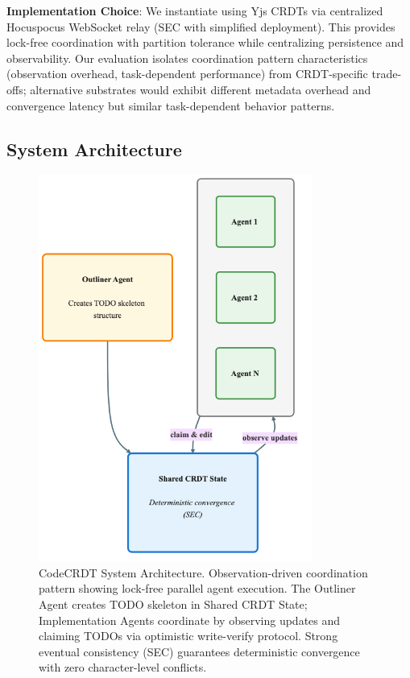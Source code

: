 \documentclass{article}
\begin{document}
\textbf{Implementation Choice}: We instantiate using Yjs CRDTs via centralized Hocuspocus WebSocket relay (SEC with simplified deployment). This provides lock-free coordination with partition tolerance while centralizing persistence and observability. Our evaluation isolates coordination pattern characteristics (observation overhead, task-dependent performance) from CRDT-specific trade-offs; alternative substrates would exhibit different metadata overhead and convergence latency but similar task-dependent behavior patterns.

\subsection{System Architecture}

\begin{figure}[!ht]
\centering
\includegraphics[width=0.8\textwidth,height=0.38\textheight,keepaspectratio]{../figures/architecture.png}
\caption{CodeCRDT System Architecture. Observation-driven coordination pattern showing lock-free parallel agent execution. The Outliner Agent creates TODO skeleton in Shared CRDT State; Implementation Agents coordinate by observing updates and claiming TODOs via optimistic write-verify protocol. Strong eventual consistency (SEC) guarantees deterministic convergence with zero character-level conflicts.}
\label{fig:architecture}
\end{figure}
\end{document}
